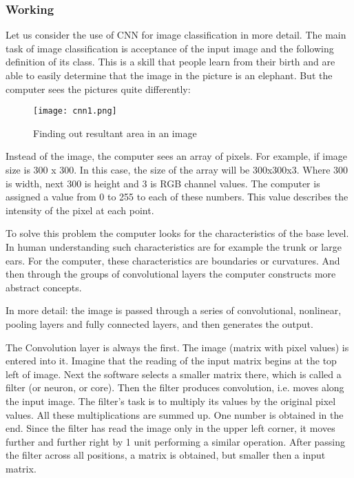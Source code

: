 \documentclass[12pt,a4paper]{article}
\begin{document}
\subsubsection{Working}
Let us consider the use of CNN for image classification in more detail. The main task of image classification is acceptance of the input image and the following definition of its class. This is a skill that people learn from their birth and are able to easily determine that the image in the picture is an elephant. But the computer sees the pictures quite differently:

\begin{figure}[h]
	\centering
	\texttt{[image: cnn1.png]}
	\caption{Finding out resultant area in an image}
\end{figure}

\par 
Instead of the image, the computer sees an array of pixels. For example, if image size is 300 x 300. In this case, the size of the array will be 300x300x3. Where 300 is width, next 300 is height and 3 is RGB channel values. The computer is assigned a value from 0 to 255 to each of these numbers. Тhis value describes the intensity of the pixel at each point.

To solve this problem the computer looks for the characteristics of the base level. In human understanding such characteristics are for example the trunk or large ears. For the computer, these characteristics are boundaries or curvatures. And then through the groups of convolutional layers the computer constructs more abstract concepts.

In more detail: the image is passed through a series of convolutional, nonlinear, pooling layers and fully connected layers, and then generates the output.

The Convolution layer is always the first. Тhe image (matrix with pixel values) is entered into it. Imagine that the reading of the input matrix begins at the top left of image. Next the software selects a smaller matrix there, which is called a filter (or neuron, or core). Then the filter produces convolution, i.e. moves along the input image. The filter’s task is to multiply its values by the original pixel values. All these multiplications are summed up. One number is obtained in the end. Since the filter has read the image only in the upper left corner, it moves further and further right by 1 unit performing a similar operation. After passing the filter across all positions, a matrix is obtained, but smaller then a input matrix.
\end{document}
